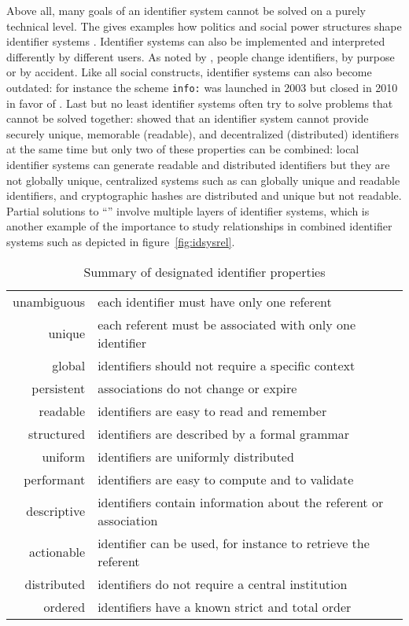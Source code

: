 Above all, many goals of an identifier system cannot be
solved on a purely technical level. The  gives
examples how politics and social power structures shape identifier systems 
\cite{Rood2000}. Identifier systems can also be implemented and interpreted
differently by different users. As noted by \textcite{BernersLee1998}, people 
change identifiers, by purpose or by accident. Like all social constructs,
identifier systems can also become outdated: for instance the  scheme
\texttt{info:} was launched in 2003 but closed in 2010 in favor of 
\cite{deSompel2006,OCLC2010}. Last but no least identifier systems often try
to solve problems that cannot be solved together:
\textcite{Zooko2001} showed that an identifier system cannot provide securely 
unique, memorable (readable), and decentralized (distributed) identifiers at 
the same time but only two of these properties can be combined: local identifier
systems can generate readable and distributed identifiers but they are not globally
unique, centralized systems such as  can globally unique and readable 
identifiers, and cryptographic hashes are distributed and unique but not
readable. Partial solutions to ``'' \cite{Stiegler2005} 
involve multiple layers of identifier systems, which is another example of
the importance to study relationships in combined identifier systems such as
depicted in figure~\ref{fig:idsysrel}.

\begin{table}
\begin{tabularx}{\linewidth}{|r|X|}
\hline
unambiguous   & each identifier must have only one referent \\
unique        & each referent must be associated with only one identifier \\
global        & identifiers should not require a specific context \\
persistent    & associations do not change or expire \\
readable      & identifiers are easy to read and remember \\
structured    & identifiers are described by a formal grammar \\
uniform       & identifiers are uniformly distributed \\
performant    & identifiers are easy to compute and to validate \\
descriptive   & identifiers contain information about the referent or association \\
actionable    & identifier can be used, for instance to retrieve the referent \\
distributed   & identifiers do not require a central institution \\
ordered       & identifiers have a known strict and total order \\
\hline
\end{tabularx}
\caption{Summary of designated identifier properties}
\label{tab:idprops}
\end{table}

